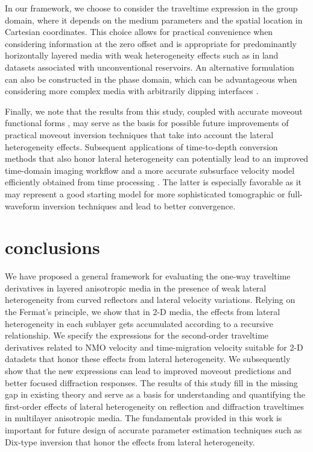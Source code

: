 In our framework, we choose to consider the traveltime expression in the group domain, where it depends on the medium parameters and the spatial location in Cartesian coordinates. This choice allows for practical convenience when considering information at the zero offset and is appropriate for predominantly horizontally layered media with weak heterogeneity effects such as in land datasets associated with unconventional reservoirs. An alternative formulation can also be constructed in the phase domain, which can be advantageous when considering more complex media with arbitrarily dipping interfaces \cite[]{nmosurface,stackingtomo}.

Finally, we note that the results from this study, coupled with accurate moveout functional forms \cite[]{fomelstovas,zonegmapaper}, may serve as the basis for possible future improvements of practical moveout inversion techniques that take into account the lateral heterogeneity effects. Subsequent applications of time-to-depth conversion methods that also honor lateral heterogeneity can potentially lead to an improved time-domain imaging workflow and a more accurate subsurface velocity model efficiently obtained from time processing \cite[]{cam,siweit2d,valente,zonet2dweak}. The latter is especially favorable as it may represent a good starting model for more sophisticated tomographic or full-waveform inversion techniques and lead to better convergence.

\section{conclusions}

We have proposed a general framework for evaluating the one-way traveltime derivatives in layered anisotropic media in the presence of weak lateral heterogeneity from curved reflectors and lateral velocity variations. Relying on the Fermat’s principle, we show that in 2-D media, the effects from lateral heterogeneity in each sublayer gets accumulated according to a recursive relationship. We specify the expressions for the second-order traveltime derivatives related to NMO velocity and time-migration velocity suitable for 2-D datadets that honor these effects from lateral heterogeneity. We subsequently show that the new expressions can lead to improved moveout predictions and better focused diffraction responses. The results of this study fill in the missing gap in existing theory and serve as a basis for understanding and quantifying the first-order effects of lateral heterogeneity on reflection and diffraction traveltimes in multilayer anisotropic media. The fundamentals provided in this work is important for future design of accurate parameter estimation techniques such as Dix-type inversion that honor the effects from lateral heterogeneity.

